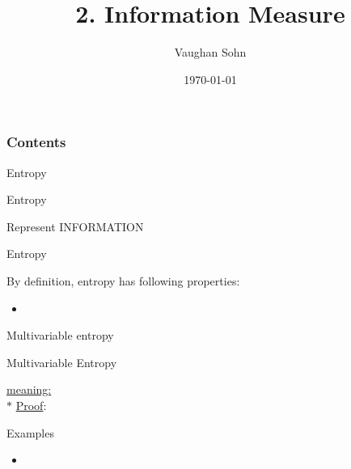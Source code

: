 \documentclass[9pt]{beamer}
\title{2. Information Measure}
\date{\today}
\author{Vaughan Sohn}
\begin{document}
    \maketitle
    
    \begin{frame}
        \frametitle{Contents}
        \tableofcontents
    \end{frame}

    \begin{section}{Entropy}
        \begin{frame}{Entropy}
            \begin{block}{Represent INFORMATION}
            
            \end{block}
            \begin{definition}
            \end{definition}
        \end{frame}

        \begin{frame}{Entropy}
            \begin{definition}
            \end{definition}
            By definition, entropy has following properties:
            \begin{itemize}
                \item 
            \end{itemize}
        \end{frame}

        \begin{frame}{Multivariable entropy}
            \begin{definition}
            \end{definition}

            \begin{definition}
            
            \end{definition}
        \end{frame}

        \begin{frame}{Multivariable Entropy}
            \begin{definition}
            \end{definition}
            \checkmark \underline {meaning:} \\
            $\ast$ \underline{Proof}:

        \end{frame}

        \begin{frame}{Examples}
            \begin{itemize}
                \item 
            \end{itemize}
        \end{frame}
    \end{section}
\end{document}
